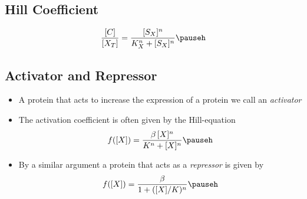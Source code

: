 
\begin{slide}
\section[-2]{Hill Coefficient}

\pb
{\small \begin{align*}
  \frac{[C]}{[X_T]} = \frac{[S_X]^n}{K_X^n + [S_X]^n}\pauseh
\end{align*}}
\begin{center}
  \pause
\end{center}

\end{slide}


\begin{slide}
\section[-2]{Activator and Repressor}

\pb
\begin{minipage}{0.66\linewidth}
  \begin{itemize}
  \item A protein that acts to increase the expression of a protein we
    call an \emph{activator}\pauseh
  \item The activation coefficient is often given by the Hill-equation
    \begin{align*}
      f([X]) = \frac{\beta \,[X]^n}{K^n + [X]^n}\pauseh
    \end{align*}
  \item By a similar argument a protein that acts as a \emph{repressor}
    is given by
    \begin{align*}
      f([X]) = \frac{\beta}{1+([X]/K)^n}\pauseh
    \end{align*}
  \end{itemize}
\end{minipage}\hfil
\begin{minipage}{0.33\linewidth}
  \begin{center}
    \pause \\
    \pause
  \end{center}
\end{minipage}


\end{slide}



